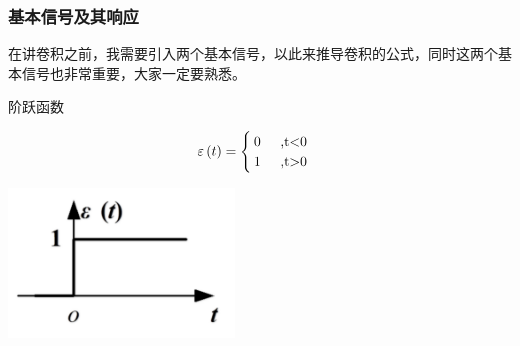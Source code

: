 \documentclass[UTF8,a4paper,12pt]{ctexart}
\begin{document}
     \subsubsection{基本信号及其响应}
     \begin{flushleft}
      在讲卷积之前，我需要引入两个基本信号，以此来推导卷积的公式，同时这两个基本信号也非常重要，大家一定要熟悉。
     \end{flushleft}
     \begin{titlebox}{阶跃函数}
   
   $$ \varepsilon \left( t \right)=
      \begin{cases}
       0 \text{\hspace{0.5cm},t<0}\\
       1 \text{\hspace{0.5cm},t>0}
      \end{cases}$$
      \begin{center}
        \par \includegraphics[width=6cm]{picture/step_signal.png}
      \end{center}
     \end{titlebox}
\end{document}
